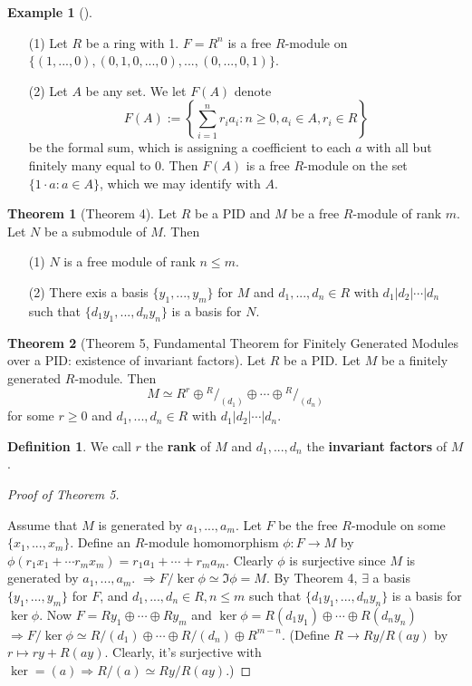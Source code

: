\documentclass{article}
\theoremstyle{definition}
\newtheorem{thm}{Theorem}
\newtheorem{ex}{Example}
\newtheorem{dfn}{Definition}
\newenvironment{proofs}[1][\proofname]{%
  \begin{proof}[#1]$ $\par\nobreak\ignorespaces
}{%
  \end{proof}
}
\newenvironment{exs}[1][]{%
  \begin{ex}[#1]$ $\par\nobreak\ignorespaces
}{%
  \end{ex}
}
\newcommand*\quot[2]{{^{\textstyle #1}\big/_{\textstyle #2}}}
\newcommand{\Ra}{\Rightarrow}
\begin{document}
\begin{exs}
	\begin{enumerate}
		\item[(1)] Let $R$ be a ring with 1. 
			$F = R^n$ is a free $R$-module on $\{(1, ..., 0), (0, 1, 0, ..., 0), ..., (0, ..., 0, 1)\}$. 

		\item[(2)] Let $A$ be any set.
			We let $F(A)$ denote 
			\[
				F(A) := \left\{\sum_{i = 1}^n r_i a_i: n \geq 0, a_i \in A, r_i \in R\right\}
			\]
			be the formal sum, which is assigning a coefficient to each $a$ with all but finitely many equal to 0.
			Then $F(A)$ is a free $R$-module on the set $\{1 \cdot a: a \in A\}$, which we may identify with $A$.
	\end{enumerate}
\end{exs}

\begin{thm}[Theorem 4]
	Let $R$ be a PID and $M$ be a free $R$-module of rank $m$.
	Let $N$ be a submodule of $M$.
	Then
	\begin{enumerate}
		\item[(1)] $N$ is a free module of rank $n \leq m$.

		\item[(2)] There exis a basis $\{y_1, ..., y_m\}$ for $M$ and $d_1, ..., d_n \in R$ with $d_1 | d_2 | \cdots | d_n$ such that $\{d_1 y_1, ..., d_n y_n\}$ is a basis for $N$.
	\end{enumerate}
\end{thm}

\begin{thm}[Theorem 5, Fundamental Theorem for Finitely Generated Modules over a PID: existence of invariant factors]
	Let $R$ be a PID.
	Let $M$ be a finitely generated $R$-module.
	Then 
	\[
		M \simeq R^r \oplus \quot{R}{(d_1)} \oplus \cdots \oplus \quot{R}{(d_n)}
	\]
	for some $r \geq 0$ and $d_1, ..., d_n \in R$ with $d_1 | d_2 | \cdots | d_n$.
\end{thm}

\begin{dfn}
	We call $r$ the \textbf{rank} of $M$ and $d_1, ..., d_n$ the \textbf{invariant factors} of $M$.
\end{dfn}

\begin{proofs}[Proof of Theorem 5]
	Assume that $M$ is generated by $a_1, ..., a_m$.
	Let $F$ be the free $R$-module on some $\{x_1, ..., x_m\}$.
	Define an $R$-module homomorphism $\phi: F \to M$ by $\phi(r_1 x_1 + \cdots r_m x_m) = r_1 a_1 + \cdots + r_m a_m$.
	Clearly $\phi$ is surjective since $M$ is generated by $a_1, ..., a_m$.
	$\Ra F/\ker \phi \simeq \Im \phi = M$.
	By Theorem 4, $\exists$ a basis $\{y_1, ..., y_m\}$ for $F$, and $d_1 ,..., d_n \in R, n \leq m$ such that $\{d_1 y_1, ..., d_n y_n\}$ is a basis for $\ker \phi$.
	Now $F = R y_1 \oplus \cdots \oplus R y_m$ and $\ker \phi = R (d_1 y_1) \oplus \cdots \oplus R (d_n y_n)$
	$\Ra F/\ker \phi \simeq R/(d_1) \oplus \cdots \oplus R/(d_n) \oplus R^{m - n}$.
	(Define $R \to R y/R (ay)$ by $r \mapsto r y + R(ay)$.
	Clearly, it's surjective with $\ker = (a) \Ra R /(a) \simeq R y / R(ay)$.)
\end{proofs}
\end{document}
